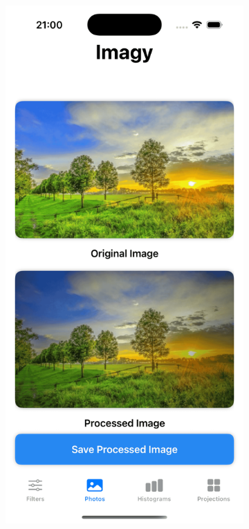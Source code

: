 \documentclass[a4paper]{article}
\begin{document}
\begin{figure}[H]
    \centering
    \begin{subfigure}{0.2\textwidth}
        \centering
        \includegraphics[width=\linewidth]{images/trees_vignette.png}

\end{subfigure}
\end{figure}
\end{document}
